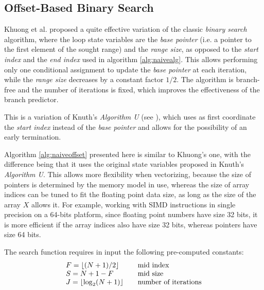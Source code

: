\documentclass[preprint,1p,times]{elsarticle}
\begin{document}
\subsection{Offset-Based Binary Search}
\label{sec:offset}
Khuong et al. \cite{Morin2015} proposed a quite effective variation of the classic \textit{binary search} algorithm, where the loop state variables are the \textit{base pointer} (i.e. a pointer to the first element of the sought range) and the \textit{range size}, as opposed to the \textit{start index} and the \textit{end index} used in algorithm \ref{alg:naivealg}. This allows performing only one conditional assignment to update the \textit{base pointer} at each iteration, while the \textit{range size} decreases by a constant factor $1/2$. The algorithm is branch-free and the number of iterations is fixed, which improves the effectiveness of the branch predictor.

This is a variation of Knuth's \textit{Algorithm U} (see \cite{Knuth1997}), which uses as first coordinate the \textit{start index} instead of the \textit{base pointer} and allows for the possibility of an early termination.  



Algorithm \ref{alg:naiveoffset} presented here is similar to Khuong's one, with the difference being that it uses the original state variables proposed in Knuth's \textit{Algorithm U}. This allows more flexibility when vectorizing, because the size of pointers is determined by the memory model in use, whereas the size of array indices can be tuned to fit the floating point data size, as long as the size of the array $X$ allows it. For example, working with SIMD instructions in single precision on a 64-bits platform, since floating point numbers have size 32 bits, it is more efficient if the array indices also have size 32 bits, whereas pointers have size 64 bits.



The search function requires in input the following pre-computed constants:
$$
	\begin{array}{lll}
		F=\left \lfloor (N+1)/2 \right \rfloor & & \text{mid index}  \\
		S=N+1-F  & & \text{mid size} \\
		J=\left \lfloor \log_2(N+1) \right \rfloor & & \text{number of iterations}
	\end{array}
$$
\end{document}
